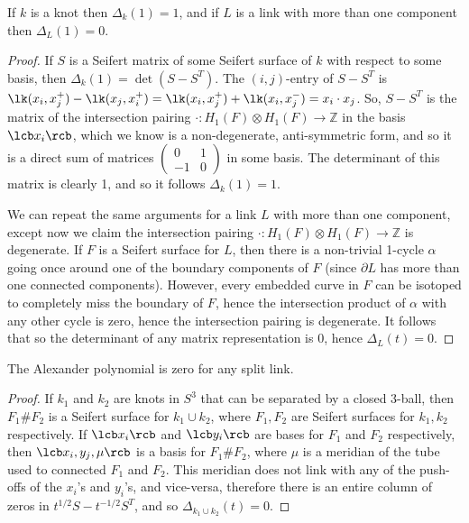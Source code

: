 \begin{exercise}
If $k$ is a knot then $\Delta_k(1)=1$, and if $L$ is a link with more than one component then $\Delta_L(1)=0$.
\end{exercise}
\begin{proof}
If $S$ is a Seifert matrix of some Seifert surface of $k$ with respect to some basis, then $\Delta_k(1) = \det(S-S^T)$. The $(i,j)$-entry of $S-S^T$ is $\lk(x_i,x_j^+)-\lk(x_j,x_i^+) = \lk(x_i,x_j^+)+\lk(x_i,x_j^-) = x_i \cdot x_j$. So, $S-S^T$ is the matrix of the intersection pairing $\cdot : H_1(F) \otimes H_1(F) \rightarrow \mathbb Z$ in the basis $\lcb x_i \rcb$, which we know is a non-degenerate, anti-symmetric form, and so it is a direct sum of matrices $\begin{pmatrix} 0&1\\-1&0 \end{pmatrix}$ in some basis. The determinant of this matrix is clearly 1, and so it follows $\Delta_k(1)=1$.

We can repeat the same arguments for a link $L$ with more than one component, except now we claim the intersection pairing $\cdot : H_1(F) \otimes H_1(F) \rightarrow \mathbb Z$ is degenerate. If $F$ is a Seifert surface for $L$, then there is a non-trivial 1-cycle $\alpha$ going once around one of the boundary components of $F$ (since $\partial L$ has more than one connected components). However, every embedded curve in $F$ can be isotoped to completely miss the boundary of $F$, hence the intersection product of $\alpha$ with any other cycle is zero, hence the intersection pairing is degenerate. It follows that so the determinant of any matrix representation is 0, hence $\Delta_L(t)=0$.
\end{proof}


\begin{exercise}
The Alexander polynomial is zero for any split link.
\end{exercise}
\begin{proof}
If $k_1$ and $k_2$ are knots in $S^3$ that can be separated by a closed 3-ball, then $F_1 \# F_2$ is a Seifert surface for $k_1 \cup k_2$, where $F_1,F_2$ are Seifert surfaces for $k_1,k_2$ respectively. If $\lcb x_i \rcb$ and $\lcb y_i \rcb$ are bases for $F_1$ and $F_2$ respectively, then $\lcb x_i,y_j,\mu \rcb$ is a basis for $F_1 \# F_2$, where $\mu$ is a meridian of the tube used to connected $F_1$ and $F_2$. This meridian does not link with any of the push-offs of the $x_i$'s and $y_i$'s, and vice-versa, therefore there is an entire column of zeros in $t^{1/2}S-t^{-1/2}S^T$, and so $\Delta_{k_1\cup k_2}(t)=0$.
\end{proof}


